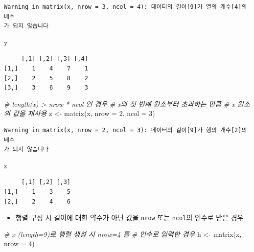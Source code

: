 \documentclass[
  11pt,
]{krantz}
\newenvironment{Shaded}{\begin{snugshade}}{\end{snugshade}}
\newcommand{\AttributeTok}[1]{\textcolor[rgb]{0.61,0.61,0.61}{#1}}
\newcommand{\CommentTok}[1]{\textcolor[rgb]{0.37,0.37,0.37}{\textit{#1}}}
\newcommand{\DecValTok}[1]{\textcolor[rgb]{0.06,0.06,0.06}{#1}}
\newcommand{\FunctionTok}[1]{\textcolor[rgb]{0,0,0}{#1}}
\newcommand{\NormalTok}[1]{#1}
\newcommand{\OtherTok}[1]{\textcolor[rgb]{0.37,0.37,0.37}{#1}}
\providecommand{\tightlist}{%
  \setlength{\itemsep}{0pt}\setlength{\parskip}{0pt}}
\begin{document}
\begin{verbatim}
Warning in matrix(x, nrow = 3, ncol = 4): 데이터의 길이[9]가 열의 개수[4]의 배수
가 되지 않습니다
\end{verbatim}

\begin{Shaded}
\begin{Highlighting}[]
\NormalTok{y}
\end{Highlighting}
\end{Shaded}

\begin{verbatim}
     [,1] [,2] [,3] [,4]
[1,]    1    4    7    1
[2,]    2    5    8    2
[3,]    3    6    9    3
\end{verbatim}

\begin{Shaded}
\begin{Highlighting}[]
\CommentTok{\# length(x) \textgreater{} nrow * ncol 인 경우 }
\CommentTok{\# x의 첫 번쨰 원소부터 초과하는 만큼 }
\CommentTok{\# x 원소의 값을 재사용}
\NormalTok{z }\OtherTok{\textless{}{-}} \FunctionTok{matrix}\NormalTok{(x, }\AttributeTok{nrow =} \DecValTok{2}\NormalTok{, }\AttributeTok{ncol =} \DecValTok{3}\NormalTok{)}
\end{Highlighting}
\end{Shaded}

\begin{verbatim}
Warning in matrix(x, nrow = 2, ncol = 3): 데이터의 길이[9]가 행의 개수[2]의 배수
가 되지 않습니다
\end{verbatim}

\begin{Shaded}
\begin{Highlighting}[]
\NormalTok{z}
\end{Highlighting}
\end{Shaded}

\begin{verbatim}
     [,1] [,2] [,3]
[1,]    1    3    5
[2,]    2    4    6
\end{verbatim}

\normalsize

\begin{itemize}
\tightlist
\item
  행렬 구성 시 길이에 대한 약수가 아닌 값을 \texttt{nrow} 또는 \texttt{ncol}의 인수로 받은 경우
\end{itemize}

\footnotesize

\begin{Shaded}
\begin{Highlighting}[]
\CommentTok{\# x (length=9)로 행렬 생성 시 nrow=4 를}
\CommentTok{\# 인수로 입력한 경우}
\NormalTok{h }\OtherTok{\textless{}{-}} \FunctionTok{matrix}\NormalTok{(x, }\AttributeTok{nrow =} \DecValTok{4}\NormalTok{)}
\end{Highlighting}
\end{Shaded}
\end{document}
